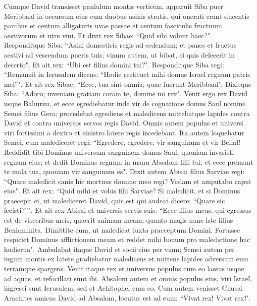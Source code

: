 \begin{biblechapter}  
\verse Cumque David transisset paululum montis verticem, apparuit Siba puer Meribbaal in occursum eius cum duobus asinis stratis, qui onerati erant ducentis panibus et centum alligaturis uvae passae et centum fasciculis fructuum aestivorum et utre vini. 
\verse Et dixit rex Sibae: “Quid sibi volunt haec?". Responditque Siba: “Asini domesticis regis ad sedendum; et panes et fructus aestivi ad vescendum pueris tuis; vinum autem, ut bibat, si quis defecerit in deserto". 
\verse Et ait rex: “Ubi est filius domini tui?". Responditque Siba regi: “Remansit in Ierusalem dicens: “Hodie restituet mihi domus Israel regnum patris mei”". 
\verse Et ait rex Sibae: “Ecce, tua sint omnia, quae fuerunt Meribbaal". Dixitque Siba: “Adoro; inveniam gratiam coram te, domine mi rex".  
\verse Venit ergo rex David usque Bahurim, et ecce egrediebatur inde vir de cognatione domus Saul nomine Semei filius Gera; procedebat egrediens et maledicens 
\verse mittebatque lapides contra David et contra universos servos regis David. Omnis autem populus et universi viri fortissimi a dextro et sinistro latere regis incedebant. 
\verse Ita autem loquebatur Semei, cum malediceret regi: “Egredere, egredere, vir sanguinum et vir Belial! 
\verse Reddidit tibi Dominus universum sanguinem domus Saul, quoniam invasisti regnum eius; et dedit Dominus regnum in manu Absalom filii tui; et ecce premunt te mala tua, quoniam vir sanguinum es". 
\verse Dixit autem Abisai filius Sarviae regi: “Quare maledicit canis hic mortuus domino meo regi? Vadam et amputabo caput eius". 
\verse Et ait rex: “Quid mihi et vobis filii Sarviae? Si maledicit, et si Dominus praecepit ei, ut malediceret David, quis est qui audeat dicere: “Quare sic fecisti?”". 
\verse Et ait rex Abisai et universis servis suis: “Ecce filius meus, qui egressus est de visceribus meis, quaerit animam meam; quanto magis nunc iste filius Beniaminita. Dimittite eum, ut maledicat iuxta praeceptum Domini. 
\verse Fortasse respiciet Dominus afflictionem meam et reddet mihi bonum pro maledictione hac hodierna". 
\verse Ambulabat itaque David et socii eius per viam; Semei autem per iugum montis ex latere gradiebatur maledicens et mittens lapides adversum eum terramque spargens. 
\verse Venit itaque rex et universus populus cum eo lassus usque ad aquas, et refocillati sunt ibi. 
\verse Absalom autem et omnis populus eius, viri Israel, ingressi sunt Ierusalem, sed et Achitophel cum eo. 
\verse Cum autem venisset Chusai Arachites amicus David ad Absalom, locutus est ad eum: “Vivat rex! Vivat rex!". 

\end{biblechapter}
